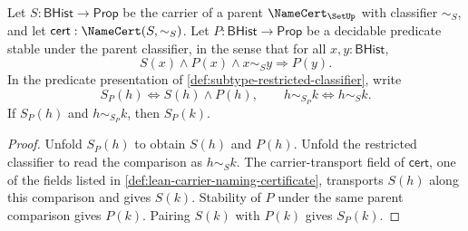 \begin{lemma}
\label{lem:subtype-carrier-restricted-classifier-closure}
Let $S:\mathsf{BHist}\to\mathsf{Prop}$ be the carrier of a parent $\NameCert_{\SetUp}$ with classifier $\sim_S$, and let $\mathsf{cert}:\NameCert(S,\sim_S)$. Let $P:\mathsf{BHist}\to\mathsf{Prop}$ be a decidable predicate stable under the parent classifier, in the sense that for all $x,y:\mathsf{BHist}$,
$$
S(x)\land P(x)\land x\sim_S y\Longrightarrow P(y).
$$
In the predicate presentation of \autoref{def:subtype-restricted-classifier}, write
$$
S_P(h)\Longleftrightarrow S(h)\land P(h),
\qquad
h\sim_{S_P}k\Longleftrightarrow h\sim_S k.
$$
If $S_P(h)$ and $h\sim_{S_P}k$, then $S_P(k)$.
\end{lemma}
\begin{proof}
Unfold $S_P(h)$ to obtain $S(h)$ and $P(h)$. Unfold the restricted classifier to read the comparison as $h\sim_S k$. The carrier-transport field of $\mathsf{cert}$, one of the fields listed in \autoref{def:lean-carrier-naming-certificate}, transports $S(h)$ along this comparison and gives $S(k)$. Stability of $P$ under the same parent comparison gives $P(k)$. Pairing $S(k)$ with $P(k)$ gives $S_P(k)$.
\end{proof}

